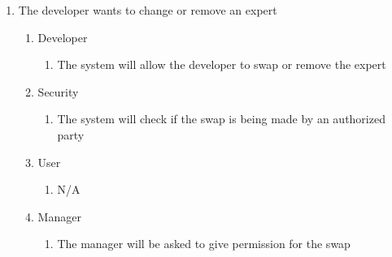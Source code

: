 \documentclass[titlepage]{article}
\begin{document}
\begin{enumerate}[{BE}1.]
	\item The developer wants to change or remove an expert
	\begin{enumerate}[{VP\theenumi}.1]
		\item Developer
			\begin{enumerate}
				\item The system will allow the developer to swap or remove the expert
			\end{enumerate}
		\item Security
			\begin{enumerate}
				\item The system will check if the swap is being made by an authorized party
			\end{enumerate}
		\item User
            \begin{enumerate}
                \item N/A
            \end{enumerate}
        \item Manager
            \begin{enumerate}
                \item The manager will be asked to give permission for the swap
            \end{enumerate}
	\end{enumerate}


\end{enumerate}
\end{document}
